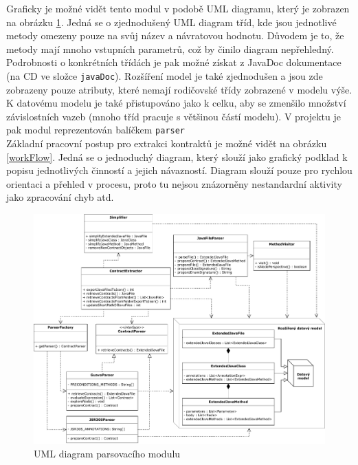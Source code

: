 			Graficky je možné vidět tento modul v podobě UML diagramu, který je zobrazen na obrázku \ref{parserUMLdiagram}. Jedná se o zjednodušený UML diagram tříd, kde jsou jednotlivé metody omezeny pouze na svůj název a návratovou hodnotu. Důvodem je to, že metody mají mnoho vstupních parametrů, což by činilo diagram nepřehledný. Podrobnosti o konkrétních třídách je pak možné získat z JavaDoc dokumentace (na CD ve složce \texttt{javaDoc}). Rozšíření model je také zjednodušen a jsou zde zobrazeny pouze atributy, které nemají rodičovské třídy zobrazené v modelu výše. K datovému modelu je také přistupováno jako k celku, aby se zmenšilo množství závislostních vazeb (mnoho tříd pracuje s většinou částí modelu). V projektu je pak modul reprezentován balíčkem \texttt{parser}\\
			
			Základní pracovní postup pro extrakci kontraktů je možné vidět na obrázku \ref{workFlow}. Jedná se o jednoduchý diagram, který slouží jako grafický podklad k popisu jednotlivých činností a jejich návazností. Diagram slouží pouze pro rychlou orientaci a přehled v procesu, proto tu nejsou znázorněny nestandardní aktivity jako zpracování chyb atd.

				\begin{figure}[!htb]
						\centering
						\includegraphics[width=1\textwidth]{img/parserUMLdiagram.pdf}
						\caption[parserUMLdiagram]{UML diagram parsovacího modulu}
						\label{parserUMLdiagram}
					\endminipage\hfill
				\end{figure}
			
